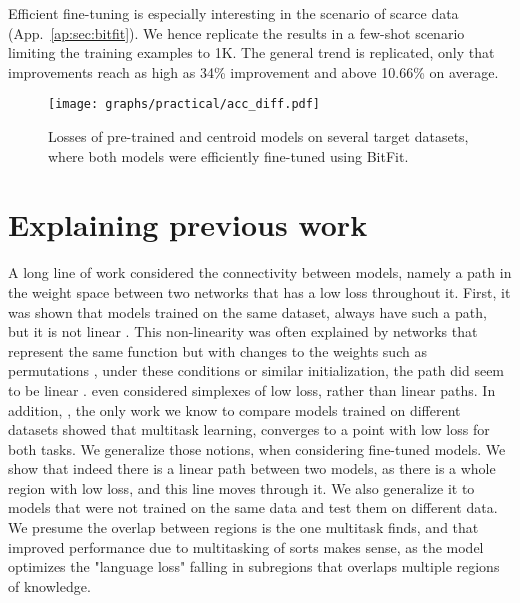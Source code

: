 \documentclass[nohyperref]{article}
\theoremstyle{plain}
\theoremstyle{definition}
\theoremstyle{remark}
\begin{document}
Efficient fine-tuning is especially interesting in the scenario of scarce data (App.~\ref{ap:sec:bitfit}). We hence replicate the results in a few-shot scenario limiting the training examples to 1K. The general trend is replicated, only that improvements reach as high as 34\% improvement and above 10.66\% on average.


\begin{figure}[t]
\centering
    \texttt{[image: graphs/practical/acc\_diff.pdf]}
\caption{Losses of pre-trained and centroid models on several target datasets, where both models were efficiently fine-tuned using BitFit.\label{fig:bitfit}}
\end{figure}

\section{Explaining previous work}\label{sec:related}
A long line of work considered the connectivity between models, namely a path in the weight space between two networks that has a low loss throughout it. First, it was shown that models trained on the same dataset, always have such a path, but it is not linear \citep{garipov2018loss, pmlr-v119-frankle20a}. This non-linearity was often explained by networks that represent the same function but with changes to the weights such as permutations \citep{ainsworth2022git,jordan2022repair, 6796044,HECHTNIELSEN1990129}, under these conditions or similar initialization, the path did seem to be linear \citep{mcmahan2017communication,entezari2021role}. \citet{benton2021loss} even considered simplexes of low loss, rather than linear paths. In addition, \citet{mirzadeh2020linear}, the only work we know to compare models trained on different datasets showed that multitask learning, converges to a point with low loss for both tasks. We generalize those notions, when considering fine-tuned  models. We show that indeed there is a linear path between two models, as there is a whole region with low loss, and this line moves through it. We also generalize it to models that were not trained on the same data and test them on different data. We presume the overlap between regions is the one multitask finds, and that improved performance due to multitasking of sorts \citep{aghajanyan-etal-2021-muppet} makes sense, as the model optimizes the "language loss" falling in subregions that overlaps multiple regions of knowledge.
\end{document}
